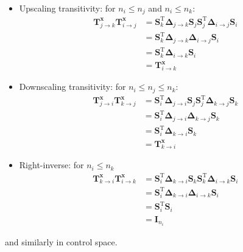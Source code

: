 \documentclass[12pt]{scrartcl}
\begin{document}
\begin{itemize}
\item Upscaling transitivity: for $n_i \le n_j$ and $n_i \le n_k$:
\begin{align}
\mathbf{T}^\mathbf{x}_{j \rightarrow k} \mathbf{T}^\mathbf{x}_{i \rightarrow j} & = \mathbf{S}^\mathrm{T}_k \boldsymbol{\Delta}_{j \rightarrow k} \mathbf{S}_j \mathbf{S}^\mathrm{T}_j  \boldsymbol{\Delta}_{i \rightarrow j} \mathbf{S}_i \nonumber \\
& = \mathbf{S}^\mathrm{T}_k \boldsymbol{\Delta}_{j \rightarrow k} \boldsymbol{\Delta}_{i \rightarrow j} \mathbf{S}_i \nonumber \\
& = \mathbf{S}^\mathrm{T}_k \boldsymbol{\Delta}_{i \rightarrow k} \mathbf{S}_i \nonumber \\
& = \mathbf{T}^\mathbf{x}_{i \rightarrow k}
\end{align}
\item Downscaling transitivity: for $n_i \le n_j \le n_k$:
\begin{align}
\mathbf{T}^\mathbf{x}_{j \rightarrow i} \mathbf{T}^\mathbf{x}_{k \rightarrow j} & = \mathbf{S}^\mathrm{T}_i \boldsymbol{\Delta}_{j \rightarrow i} \mathbf{S}_j \mathbf{S}^\mathrm{T}_j \boldsymbol{\Delta}_{k \rightarrow j} \mathbf{S}_k \nonumber \\
& = \mathbf{S}^\mathrm{T}_i \boldsymbol{\Delta}_{j \rightarrow i} \boldsymbol{\Delta}_{k \rightarrow j} \mathbf{S}_k \nonumber \\
& = \mathbf{S}^\mathrm{T}_i \boldsymbol{\Delta}_{k \rightarrow i} \mathbf{S}_k \nonumber \\
& = \mathbf{T}^\mathbf{x}_{k \rightarrow i}
\end{align}
\item Right-inverse: for $n_i \le n_k$
\begin{align}
\mathbf{T}^\mathbf{x}_{k \rightarrow i} \mathbf{T}^\mathbf{x}_{i \rightarrow k} & = \mathbf{S}^\mathrm{T}_i \boldsymbol{\Delta}_{k \rightarrow i} \mathbf{S}_k \mathbf{S}^\mathrm{T}_k \boldsymbol{\Delta}_{i \rightarrow k} \mathbf{S}_i \nonumber \\
& = \mathbf{S}^\mathrm{T}_i \boldsymbol{\Delta}_{k \rightarrow i} \boldsymbol{\Delta}_{i \rightarrow k} \mathbf{S}_i \nonumber \\
& = \mathbf{S}^\mathrm{T}_i \mathbf{S}_i \nonumber \\
& = \mathbf{I}_{n_i}
\end{align}
\end{itemize}
and similarly in control space.
\end{document}
